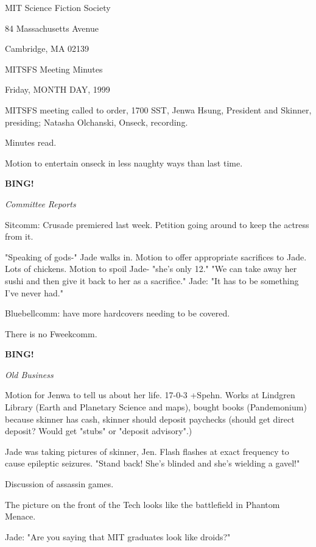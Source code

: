 \documentclass[12pt]{article}
\newcommand{\bing}{{\bf BING!} }
\newcommand{\goto}[1]{\bing \vskip 12pt \centerline{{\em{#1}}}}
\begin{document}
\begin{center}

MIT Science Fiction Society 

84 Massachusetts Avenue

Cambridge, MA 02139

\vspace{12pt}

MITSFS Meeting Minutes 

Friday, MONTH DAY, 1999

\end{center}
 
\vspace{18pt}

\setlength{\parskip}{6pt}

\noindent
MITSFS meeting called to order, 1700 SST,
Jenwa Hsung, President and Skinner, presiding; Natasha Olchanski, Onseck, recording.

Minutes read.

Motion to entertain onseck in less naughty ways than last time.

\goto{Committee Reports}

Sitcomm: Crusade premiered last week. Petition going around to keep the actress from it.

"Speaking of gods-" Jade walks in. Motion to offer appropriate sacrifices to Jade. Lots of chickens. Motion to spoil Jade- "she's only 12." "We can take away her sushi and then give it back to her as a sacrifice." Jade: "It has to be something I've never had."

Bluebellcomm: have more hardcovers needing to be covered.

There is no Fweekcomm.

\goto{Old Business}

Motion for Jenwa to tell us about her life. 17-0-3 +Spehn. Works at Lindgren Library (Earth and Planetary Science and maps), bought books (Pandemonium) because skinner has cash, skinner should deposit paychecks (should get direct deposit? Would get "stubs" or "deposit advisory".)

Jade was taking pictures of skinner, Jen. Flash flashes at exact frequency to cause epileptic seizures. "Stand back! She's blinded and she's wielding a gavel!"

Discussion of assassin games.

The picture on the front of the Tech looks like the battlefield in Phantom Menace.

Jade: "Are you saying that MIT graduates look like droids?"
\end{document}
